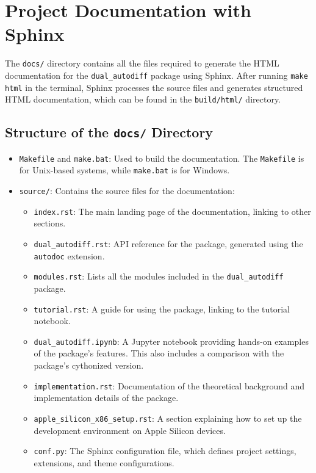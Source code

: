 \documentclass[a4paper,12pt]{article}
\begin{document}
\section{Project Documentation with Sphinx}

The \texttt{docs/} directory contains all the files required to generate the HTML documentation for the \texttt{dual\_autodiff} package using Sphinx. After running \texttt{make html} in the terminal, Sphinx processes the source files and generates structured HTML documentation, which can be found in the \texttt{build/html/} directory.

\subsection{Structure of the \texttt{docs/} Directory}
\begin{itemize}
    \item \texttt{Makefile} and \texttt{make.bat}: Used to build the documentation. The \texttt{Makefile} is for Unix-based systems, while \texttt{make.bat} is for Windows.
    \item \texttt{source/}: Contains the source files for the documentation:
    \begin{itemize}
        \item \texttt{index.rst}: The main landing page of the documentation, linking to other sections.
        \item \texttt{dual\_autodiff.rst}: API reference for the package, generated using the \texttt{autodoc} extension.
        \item \texttt{modules.rst}: Lists all the modules included in the \texttt{dual\_autodiff} package.
        \item \texttt{tutorial.rst}: A guide for using the package, linking to the tutorial notebook.
        \item \texttt{dual\_autodiff.ipynb}: A Jupyter notebook providing hands-on examples of the package's features. This also includes a comparison with the package's cythonized version.
        \item \texttt{implementation.rst}: Documentation of the theoretical background and implementation details of the package.
        \item \texttt{apple\_silicon\_x86\_setup.rst}: A section explaining how to set up the development environment on Apple Silicon devices.
        \item \texttt{conf.py}: The Sphinx configuration file, which defines project settings, extensions, and theme configurations.
    \end{itemize}


\end{itemize}
\end{document}

